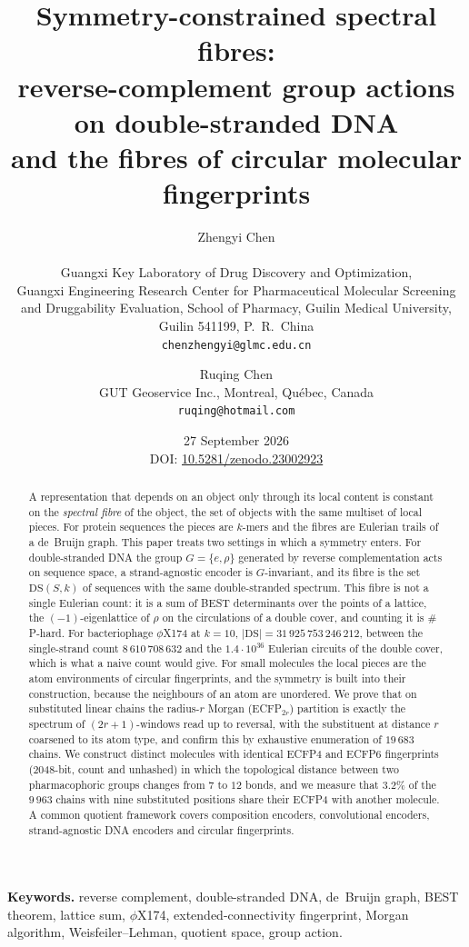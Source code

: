 \documentclass[11pt]{article}
\title{\bfseries Symmetry-constrained spectral fibres:\\ reverse-complement group actions on double-stranded
DNA\\ and the fibres of circular molecular fingerprints}
\author{Zhengyi Chen\\[2pt]
\normalsize\begin{tabular}{c}
Guangxi Key Laboratory of Drug Discovery and Optimization,\\
Guangxi Engineering Research Center for Pharmaceutical Molecular Screening\\
and Druggability Evaluation, School of Pharmacy, Guilin Medical University,\\
Guilin 541199, P.~R.~China\\
\texttt{chenzhengyi@glmc.edu.cn}
\end{tabular}
\and
Ruqing Chen\\[2pt]
\normalsize GUT Geoservice Inc., Montreal, Qu\'ebec, Canada\\
\normalsize\texttt{ruqing@hotmail.com}}
\date{27 September 2026\\[4pt]\small DOI: \href{https://doi.org/10.5281/zenodo.23002923}{10.5281/zenodo.23002923}}
\theoremstyle{plain}
\theoremstyle{definition}
\theoremstyle{remark}
\newcommand{\DS}{\mathrm{DS}}
\begin{document}
\maketitle

\begin{abstract}
\noindent
A representation that depends on an object only through its local content is constant on the
\emph{spectral fibre} of the object, the set of objects with the same multiset of local pieces. For
protein sequences the pieces are $k$-mers and the fibres are Eulerian trails of a de~Bruijn graph. This
paper treats two settings in which a symmetry enters. For double-stranded DNA the group $G=\{e,\rho\}$
generated by reverse complementation acts on sequence space, a strand-agnostic encoder is $G$-invariant,
and its fibre is the set $\DS(S,k)$ of sequences with the same double-stranded spectrum. This fibre is not a
single Eulerian count: it is a sum of BEST determinants over the points of a lattice, the $(-1)$-eigenlattice
of $\rho$ on the circulations of a double cover, and counting it is $\#$P-hard. For bacteriophage
$\phi$X174 at $k=10$, $|\DS|=31\,925\,753\,246\,212$, between the single-strand count $8\,610\,708\,632$ and
the $1.4\cdot10^{36}$ Eulerian circuits of the double cover, which is what a naive count would give. For small
molecules the local pieces are the atom environments of circular fingerprints, and the symmetry is built into
their construction, because the neighbours of an atom are unordered. We prove that on substituted linear
chains the radius-$r$ Morgan (ECFP$_{2r}$) partition is exactly the spectrum of $(2r+1)$-windows read up to
reversal, with the substituent at distance $r$ coarsened to its atom type, and confirm this by exhaustive
enumeration of $19\,683$ chains. We construct distinct molecules with identical ECFP4 and ECFP6 fingerprints
(2048-bit, count and unhashed) in which the topological distance between two pharmacophoric groups changes from
$7$ to $12$ bonds, and we measure that $3.2\%$ of the $9\,963$ chains with nine substituted positions share
their ECFP4 with another molecule. A common quotient framework covers composition encoders, convolutional
encoders, strand-agnostic DNA encoders and circular fingerprints.
\end{abstract}

\medskip
\noindent\textbf{Keywords.} reverse complement, double-stranded DNA, de~Bruijn graph, BEST theorem, lattice
sum, $\phi$X174, extended-connectivity fingerprint, Morgan algorithm, Weisfeiler--Lehman, quotient space,
group action.
\end{document}
